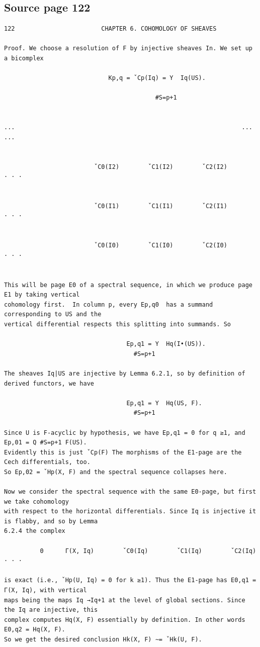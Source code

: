 \subsection*{Source page 122}
\begin{Verbatim}[fontsize=\small]
122                        CHAPTER 6. COHOMOLOGY OF SHEAVES

Proof. We choose a resolution of F by injective sheaves In. We set up a bicomplex

                             Kp,q = ˇCp(Iq) = Y  Iq(US).

                                          #S=p+1

                                                                                                                            ...                                                               ...                                                               ...


                         ˇC0(I2)        ˇC1(I2)        ˇC2(I2)            · · ·


                         ˇC0(I1)        ˇC1(I1)        ˇC2(I1)            · · ·


                         ˇC0(I0)        ˇC1(I0)        ˇC2(I0)            · · ·


This will be page E0 of a spectral sequence, in which we produce page E1 by taking vertical
cohomology first.  In column p, every Ep,q0  has a summand corresponding to US and the
vertical differential respects this splitting into summands. So

                                  Ep,q1 = Y  Hq(I•(US)).
                                    #S=p+1

The sheaves Iq|US are injective by Lemma 6.2.1, so by definition of derived functors, we have

                                  Ep,q1 = Y  Hq(US, F).
                                    #S=p+1

Since U is F-acyclic by hypothesis, we have Ep,q1 = 0 for q ≥1, and Ep,01 = Q #S=p+1 F(US).
Evidently this is just ˇCp(F) The morphisms of the E1-page are the Cech differentials, too.
So Ep,02 = ˇHp(X, F) and the spectral sequence collapses here.

Now we consider the spectral sequence with the same E0-page, but first we take cohomology
with respect to the horizontal differentials. Since Iq is injective it is flabby, and so by Lemma
6.2.4 the complex

          0      Γ(X, Iq)        ˇC0(Iq)        ˇC1(Iq)        ˇC2(Iq)            · · ·

is exact (i.e., ˇHp(U, Iq) = 0 for k ≥1). Thus the E1-page has E0,q1 = Γ(X, Iq), with vertical
maps being the maps Iq →Iq+1 at the level of global sections. Since the Iq are injective, this
complex computes Hq(X, F) essentially by definition. In other words E0,q2 = Hq(X, F).
So we get the desired conclusion Hk(X, F) ∼= ˇHk(U, F).
\end{Verbatim}

